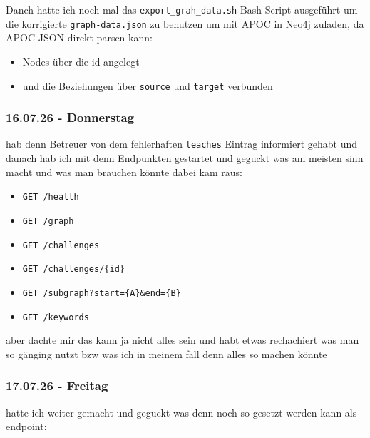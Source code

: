 Danch hatte ich noch mal das \texttt{export\_grah\_data.sh} Bash-Script ausgeführt um die korrigierte \texttt{graph-data.json} zu benutzen um mit APOC in Neo4j zuladen, da APOC JSON direkt parsen kann:

\begin{itemize}
\item Nodes über die id angelegt
\item und die Beziehungen über \texttt{source} und \texttt{target} verbunden
\end{itemize}

\subsubsection{16.07.26 - Donnerstag}

hab denn Betreuer von dem fehlerhaften \texttt{teaches} Eintrag informiert gehabt und danach hab ich mit denn Endpunkten gestartet und geguckt was am meisten sinn macht und was man brauchen könnte dabei kam raus:

\begin{itemize}
\item \texttt{GET /health}
\item \texttt{GET /graph}
\item \texttt{GET /challenges}
\item \texttt{GET /challenges/\{id\}}
\item \texttt{GET /subgraph?start=\{A\}\&end=\{B\}}
\item \texttt{GET /keywords}
\end{itemize}

aber dachte mir das kann ja nicht alles sein und habt etwas rechachiert was man so gänging nutzt bzw was ich in meinem fall denn alles so machen könnte

\subsubsection{17.07.26 - Freitag}

hatte ich weiter gemacht und geguckt was denn noch so gesetzt werden kann als endpoint:

